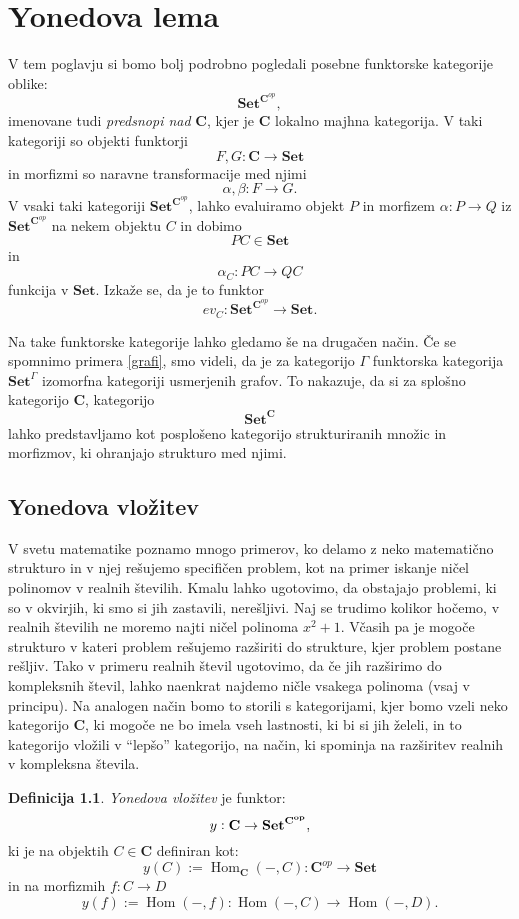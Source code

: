 \documentclass[12pt,a4paper]{book}
\theoremstyle{definition}
\newtheorem{definicija}{Definicija}[chapter]
\theoremstyle{plain}
\theoremstyle{definition}
\theoremstyle{remark}
\newcommand{\cat}[1]{\textbf{#1}}
\DeclareMathOperator{\Hom}{Hom}
\newcommand{\predsnop}[1]{\cat{Set}^{\cat{#1}^{op}}}
\begin{document}
\chapter{Yonedova lema}

V tem poglavju si bomo bolj podrobno pogledali posebne funktorske kategorije oblike:
$$\predsnop{C},$$
imenovane tudi \emph{predsnopi nad }$\cat{C}$, kjer je $\cat{C}$ lokalno majhna kategorija. V taki kategoriji so objekti funktorji 
$$F,G : \cat{C} \to \cat{Set}$$
in morfizmi so naravne transformacije med njimi
$$\alpha, \beta : F \to G.$$ 
V vsaki taki kategoriji $\predsnop{C}$, lahko evaluiramo objekt $P$ in morfizem $\alpha : P \to Q$ iz $\predsnop{C}$ na nekem objektu $C$ in dobimo 
$$PC \in \cat{Set}$$ 
in 
$$\alpha_C : PC \to QC$$
funkcija v $\cat{Set}$. Izkaže se, da je to funktor
$$ ev_C : \predsnop{C} \to \cat{Set}.$$

Na take funktorske kategorije lahko gledamo še na drugačen način.
Če se spomnimo primera \ref{grafi}, smo videli, da je za kategorijo $\Gamma$ funktorska kategorija $\cat{Set}^\Gamma$ izomorfna kategoriji usmerjenih grafov. To nakazuje, da si za splošno kategorijo $\cat{C}$, kategorijo
$$\cat{Set}^\cat{C}$$
lahko predstavljamo kot posplošeno kategorijo strukturiranih množic in morfizmov, ki ohranjajo strukturo med njimi.


\section{Yonedova vložitev}

V svetu matematike poznamo mnogo primerov, ko delamo z neko matematično strukturo in v njej rešujemo specifičen problem, kot na primer iskanje ničel polinomov v realnih številih. Kmalu lahko ugotovimo, da obstajajo problemi, ki so v okvirjih, ki smo si jih zastavili, nerešljivi. Naj se trudimo kolikor hočemo, v realnih številih ne moremo najti ničel polinoma $x^2 + 1$.
Včasih pa je mogoče strukturo v kateri problem rešujemo razširiti do strukture, kjer problem postane rešljiv.
Tako v primeru realnih števil ugotovimo, da če jih razširimo do kompleksnih števil, lahko naenkrat najdemo ničle vsakega polinoma (vsaj v principu). Na analogen način bomo to storili s kategorijami, kjer bomo vzeli neko kategorijo $\cat{C}$, ki mogoče ne bo imela vseh lastnosti, ki bi si jih želeli, in to kategorijo vložili v "`lepšo"' kategorijo, na način, ki spominja na razširitev realnih v kompleksna števila. 


\begin{definicija} \emph{Yonedova vložitev} je funktor: 
$$y : \bf{C} \to \bf{Set}^{\bf{C}^{op}},$$
ki je na objektih $C \in \cat{C}$ definiran kot:
$$y(C) := \Hom_{\cat{C}}(-, C) : \cat{C}^{op} \to \cat{Set}$$ 
in na morfizmih $f : C \to D$
$$y(f) := \Hom(-,f) : \Hom(-,C) \to \Hom(-,D).$$
\end{definicija}
\end{document}
